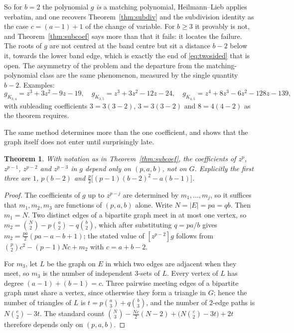 \documentclass[11pt]{article}
\newtheorem{theorem}{Theorem}
\theoremstyle{remark}
\begin{document}
So for $b=2$ the polynomial $g$ \emph{is} a matching polynomial, Heilmann--Lieb
applies verbatim, and one recovers Theorem~\ref{thm:subdiv} and the subdivision
identity as the case $c=(a-1)+1$ of the change of variable. For $b\ge3$ it
provably is not, and Theorem~\ref{thm:subcoef} says more than that it fails: it
locates the failure. The roots of $g$ are not centred at the band centre but sit
a distance $b-2$ below it, towards the lower band edge, which is exactly the
end of \eqref{eq:twosided} that is open. The asymmetry of the problem and the
departure from the matching-polynomial class are the same phenomenon, measured
by the single quantity $b-2$. Examples:
\[
g_{K_{3,4}}=z^3+3z^2-9z-19,\quad
g_{K_{3,5}}=z^3+3z^2-12z-24,\quad
g_{K_{4,5}}=z^4+8z^3-6z^2-128z-139,
\]
with subleading coefficients $3=3(3-2)$, $3=3(3-2)$ and $8=4(4-2)$ as the
theorem requires.

The same method determines more than the one coefficient, and shows that the
graph itself does not enter until surprisingly late.

\begin{theorem}\label{thm:universal}
With notation as in Theorem~\ref{thm:subcoef}, the coefficients of $z^{p}$,
$z^{p-1}$, $z^{p-2}$ and $z^{p-3}$ in $g$ depend only on $(p,a,b)$, not on $G$.
Explicitly the first three are $1$, $p(b-2)$ and
$\tfrac{p}{2}\bigl[(p-1)(b-2)^2-a(b-1)\bigr]$.
\end{theorem}

\begin{proof}
The coefficients of $g$ up to $z^{p-j}$ are determined by $m_1,\dots,m_j$, so it
suffices that $m_1,m_2,m_3$ are functions of $(p,a,b)$ alone. Write $N=|E|=pa=qb$.
Then $m_1=N$. Two distinct edges of a bipartite graph meet in at most one vertex,
so $m_2=\binom N2-p\binom a2-q\binom b2$, which after substituting $q=pa/b$ gives
$m_2=\tfrac{pa}{2}(pa-a-b+1)$; the stated value of $[z^{p-2}]g$ follows from
$\binom p2c^2-(p-1)Nc+m_2$ with $c=a+b-2$.

For $m_3$, let $L$ be the graph on $E$ in which two edges are adjacent when they
meet, so $m_3$ is the number of independent $3$-sets of $L$. Every vertex of $L$
has degree $(a-1)+(b-1)=c$. Three pairwise meeting edges of a bipartite graph
must share a vertex, since otherwise they form a triangle in $G$; hence the
number of triangles of $L$ is $t=p\binom a3+q\binom b3$, and the number of
$2$-edge paths is $N\binom c2-3t$. The standard count
$\binom N3-\tfrac{Nc}{2}(N-2)+\bigl(N\binom c2-3t\bigr)+2t$ therefore depends
only on $(p,a,b)$.
\end{proof}
\end{document}
